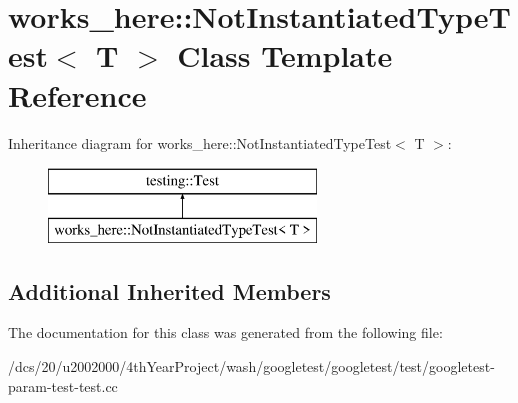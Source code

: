 \hypertarget{classworks__here_1_1NotInstantiatedTypeTest}{}\section{works\+\_\+here\+:\+:Not\+Instantiated\+Type\+Test$<$ T $>$ Class Template Reference}
\label{classworks__here_1_1NotInstantiatedTypeTest}
Inheritance diagram for works\+\_\+here\+:\+:Not\+Instantiated\+Type\+Test$<$ T $>$\+:\begin{figure}[H]
\begin{center}
\leavevmode
\includegraphics[height=2.000000cm]{classworks__here_1_1NotInstantiatedTypeTest}
\end{center}
\end{figure}
\subsection*{Additional Inherited Members}


The documentation for this class was generated from the following file\+:\begin{DoxyCompactItemize}
\item 
/dcs/20/u2002000/4th\+Year\+Project/wash/googletest/googletest/test/googletest-\/param-\/test-\/test.\+cc\end{DoxyCompactItemize}

